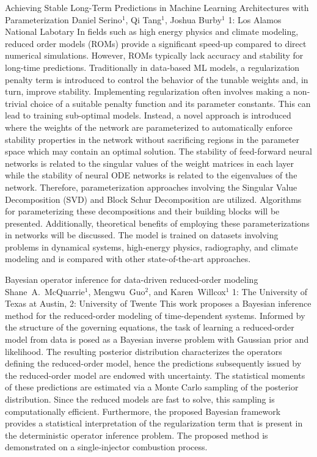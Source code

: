 \begin{addmargin}[2em]{0em}
\vspace{1.5ex}
\abs
{Achieving Stable Long-Term Predictions in Machine Learning Architectures with Parameterization}
{Daniel Serino$^{1}$, Qi Tang$^{1}$, Joshua Burby$^{1}$}
{1: Los Alamos National Labotary}
{In fields such as high energy physics and climate modeling, reduced order models (ROMs) provide a significant speed-up compared to direct numerical simulations. However, ROMs typically lack accuracy and stability for long-time predictions. Traditionally in data-based ML models, a regularization penalty term is introduced to control the behavior of the tunable weights and, in turn, improve stability. Implementing regularization often involves making a non-trivial choice of a suitable penalty function and its parameter constants. This can lead to training sub-optimal models. Instead, a novel approach is introduced where the weights of the network are parameterized to automatically enforce stability properties in the network without sacrificing regions in the parameter space which may contain an optimal solution. The stability of feed-forward neural networks is related to the singular values of the weight matrices in each layer while the stability of neural ODE networks is related to the eigenvalues of the network. Therefore, parameterization approaches involving the Singular Value Decomposition (SVD) and Block Schur Decomposition are utilized. Algorithms for parameterizing these decompositions and their building blocks will be presented. Additionally, theoretical benefits of employing these parameterizations in networks will be discussed. The model is trained on datasets involving problems in dynamical systems, high-energy physics, radiography, and climate modeling and is compared with other state-of-the-art approaches.
}


\vspace{1.5ex}
\abs
{Bayesian operator inference for data-driven reduced-order modeling}
{Shane~A.~McQuarrie$^{1}$, Mengwu~Guo$^{2}$, and Karen~Willcox$^{1}$}
{1: The University of Texas at Austin, 2: University of Twente}
{This work proposes a Bayesian inference method for the reduced-order modeling of time-dependent systems. Informed by the structure of the governing equations, the task of learning a reduced-order model from data is posed as a Bayesian inverse problem with Gaussian prior and likelihood. The resulting posterior distribution characterizes the operators defining the reduced-order model, hence the predictions subsequently issued by the reduced-order model are endowed with uncertainty. The statistical moments of these predictions are estimated via a Monte Carlo sampling of the posterior distribution. Since the reduced models are fast to solve, this sampling is computationally efficient. Furthermore, the proposed Bayesian framework provides a statistical interpretation of the regularization term that is present in the deterministic operator inference problem. The proposed method is demonstrated on a single-injector combustion process.}



\end{addmargin}
